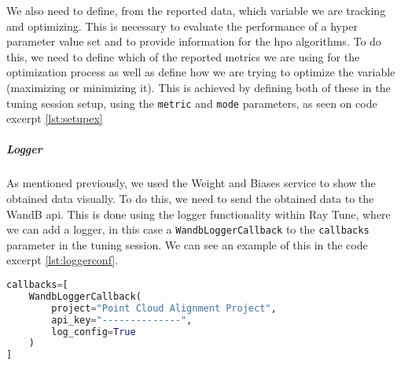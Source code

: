 We also need to define, from the reported data, which variable we are tracking and optimizing. This is necessary to evaluate the performance of a hyper parameter value set and to provide information for the \acrshort{hpo} algorithms. To do this, we need to define which of the reported metrics we are using for the optimization process as well as define how we are trying to optimize the variable (maximizing or minimizing it). This is achieved by defining both of these in the tuning session setup, using the \verb!metric! and \verb!mode! parameters, as seen on code excerpt \ref{lst:setupex}

\subparagraph{Logger}

As mentioned previously, we used the Weight and Biases service to show the obtained data visually. To do this, we need to send the obtained data to the WandB \acrshort{api}. This is done using the logger functionality within Ray Tune, where we can add a logger, in this case a \verb!WandbLoggerCallback! to the \verb!callbacks! parameter in the tuning session. We can see an example of this in the code excerpt \ref{lst:loggerconf}.

\begin{lstlisting}[language=Python, caption=Example WandB logger configuration, captionpos=b, label={lst:loggerconf}]
callbacks=[
    WandbLoggerCallback(
        project="Point Cloud Alignment Project",
        api_key="--------------",
        log_config=True
    )
]
\end{lstlisting}